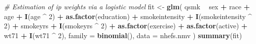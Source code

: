 \documentclass[10pt,]{book}
\newenvironment{Shaded}{\begin{snugshade}}{\end{snugshade}}
\newcommand{\CommentTok}[1]{\textcolor[rgb]{0.56,0.35,0.01}{\textit{#1}}}
\newcommand{\DataTypeTok}[1]{\textcolor[rgb]{0.13,0.29,0.53}{#1}}
\newcommand{\DecValTok}[1]{\textcolor[rgb]{0.00,0.00,0.81}{#1}}
\newcommand{\KeywordTok}[1]{\textcolor[rgb]{0.13,0.29,0.53}{\textbf{#1}}}
\newcommand{\NormalTok}[1]{#1}
\newcommand{\OperatorTok}[1]{\textcolor[rgb]{0.81,0.36,0.00}{\textbf{#1}}}
\newcommand{\StringTok}[1]{\textcolor[rgb]{0.31,0.60,0.02}{#1}}
\begin{document}
\begin{Shaded}
\begin{Highlighting}[]
\CommentTok{# Estimation of ip weights via a logistic model}
\NormalTok{fit <-}\StringTok{ }\KeywordTok{glm}\NormalTok{(}
\NormalTok{  qsmk }\OperatorTok{~}\StringTok{ }\NormalTok{sex }\OperatorTok{+}\StringTok{ }\NormalTok{race }\OperatorTok{+}\StringTok{ }\NormalTok{age }\OperatorTok{+}\StringTok{ }\KeywordTok{I}\NormalTok{(age }\OperatorTok{^}\StringTok{ }\DecValTok{2}\NormalTok{) }\OperatorTok{+}
\StringTok{    }\KeywordTok{as.factor}\NormalTok{(education) }\OperatorTok{+}\StringTok{ }\NormalTok{smokeintensity }\OperatorTok{+}
\StringTok{    }\KeywordTok{I}\NormalTok{(smokeintensity }\OperatorTok{^}\StringTok{ }\DecValTok{2}\NormalTok{) }\OperatorTok{+}\StringTok{ }\NormalTok{smokeyrs }\OperatorTok{+}\StringTok{ }\KeywordTok{I}\NormalTok{(smokeyrs }\OperatorTok{^}\StringTok{ }\DecValTok{2}\NormalTok{) }\OperatorTok{+}
\StringTok{    }\KeywordTok{as.factor}\NormalTok{(exercise) }\OperatorTok{+}\StringTok{ }\KeywordTok{as.factor}\NormalTok{(active) }\OperatorTok{+}\StringTok{ }\NormalTok{wt71 }\OperatorTok{+}\StringTok{ }\KeywordTok{I}\NormalTok{(wt71 }\OperatorTok{^}\StringTok{ }\DecValTok{2}\NormalTok{),}
  \DataTypeTok{family =} \KeywordTok{binomial}\NormalTok{(),}
  \DataTypeTok{data =}\NormalTok{ nhefs.nmv}
\NormalTok{)}
\KeywordTok{summary}\NormalTok{(fit)}
\end{Highlighting}
\end{Shaded}
\end{document}
